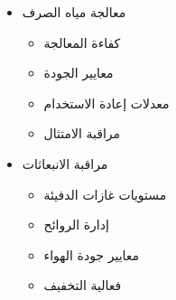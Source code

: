 \begin{itemize}
\begin{itemize}
        \item معالجة مياه الصرف
        \begin{itemize}
            \item كفاءة المعالجة
            \item معايير الجودة
            \item معدلات إعادة الاستخدام
            \item مراقبة الامتثال
        \end{itemize}
        
        \item مراقبة الانبعاثات
        \begin{itemize}
            \item مستويات غازات الدفيئة
            \item إدارة الروائح
            \item معايير جودة الهواء
            \item فعالية التخفيف
        \end{itemize}
    \end{itemize}
\end{itemize}

